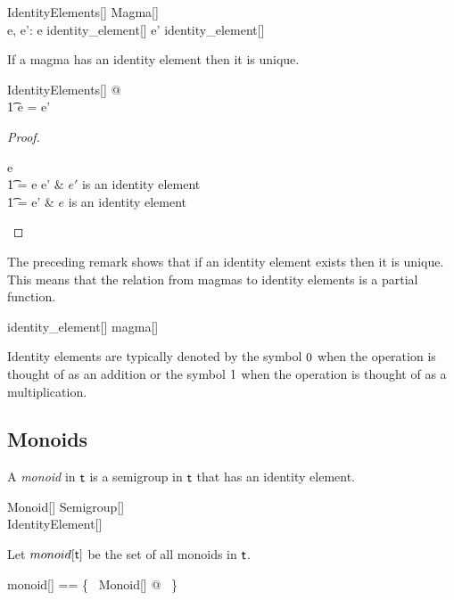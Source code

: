 \documentclass{amsart}
\begin{document}
\begin{schema}{IdentityElements}[\genT]
	Magma[\genT] \\
	e, e': \genT
\where
	\strucA \mapsto e \in identity\_element[\genT]
\also
	\strucA \mapsto e' \in identity\_element[\genT]
\end{schema}

\begin{remark}
If a magma has an identity element then it is unique.

\begin{zed}
	\forall IdentityElements[\setT] @ \\
	\t1	e = e'
\end{zed}

\begin{proof}
\begin{argue}
e \\
\t1	= e \opG e'	& $e'$ is an identity element \\
\t1	= e'			& $e$ is an identity element
\end{argue}
\end{proof}

\end{remark}

\begin{remark}
The preceding remark shows that if an identity element exists then it is unique.
This means that the relation from magmas to identity elements is a partial function.

\begin{zed}
identity\_element[\setT] \in magma[\setT] \pfun \setT
\end{zed}

\end{remark}

Identity elements are typically denoted by the symbol  $0$ when the operation is thought of as an addition
or the symbol $1$ when the operation is thought of as a multiplication.

\subsection{Monoids}

A \textit{monoid} in $\mathsf{t}$ is a semigroup in $\mathsf{t}$ that has an identity element.
\begin{schema}{Monoid}[\genT]
	Semigroup[\genT] \\
	IdentityElement[\genT]
\end{schema}

Let $monoid[\mathsf{t}]$ be the set of all monoids in $\mathsf{t}$.
\begin{zed}
	monoid[\genT] == \{~ Monoid[\genT] @ \strucA ~\}
\end{zed}
\end{document}
